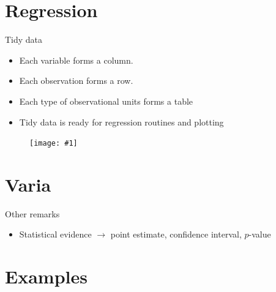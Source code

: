 \documentclass{beamer}\usepackage[]{graphicx}\usepackage[]{color}
\newcommand {\framedgraphic}[1] {
	\begin{figure}
		\centering
		\texttt{[image: \#1]}
	\end{figure}
}
\begin{document}
\section{Regression}

\begin{frame}{Tidy data}

\begin{itemize}
	\setlength\itemsep{.51em}
	\item Each variable forms a column.
	\item Each observation forms a row.
	\item Each type of observational units forms a table
	\item Tidy data is ready for regression routines and plotting
\end{itemize}


\framedgraphic{tidy.png}

\end{frame}



\section{Varia}

\begin{frame}{Other remarks}

\begin{itemize}
	\setlength\itemsep{.51em}
	\item Statistical evidence $\to$ point estimate, confidence interval, $p$-value
\end{itemize}




\end{frame}


























\section{Examples}
\end{document}
